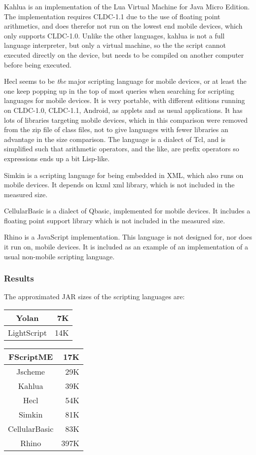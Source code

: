 \documentclass[11pt]{report}
\begin{document}
Kahlua \cite{kahlua} is an implementation of the Lua Virtual Machine for Java Micro Edition. 
The implementation requires CLDC-1.1 due to the use of floating point arithmetics, and does therefor not run on the lowest end mobile devices, which only supports CLDC-1.0.
Unlike the other languages, kahlua is not a full language interpreter, but only a virtual machine, so the the script cannot executed directly on the device, but needs to be compiled on another computer before being executed.

Hecl \cite{hecl} seems to be \emph{the} major scripting language for mobile devices, or at least the one keep popping up in the top of most queries when searching for scripting languages for mobile devices.
It is very portable, with different editions running on CLDC-1.0, CLDC-1.1, Android, as applets and as usual applications.
It has lots of libraries targeting mobile devices, which in this comparison were removed from the zip file of class files, not to give languages with fewer libraries an advantage in the size comparison.
The language is a dialect of Tcl, and is simplified such that arithmetic operators, and the like, are prefix operators so expressions ends up a bit Lisp-like.

Simkin \cite{simkin} is a scripting language for being embedded in XML, which also runs on mobile devices. It depends on kxml xml library, which is not included in the measured size. 

CellularBasic \cite{cellularbasic} is a dialect of Qbasic, implemented for mobile devices. 
It includes a floating point support library which is not included in the measured size. 

Rhino \cite{rhino} is a JavaScript implementation. This language is not designed for, nor does it run on, mobile devices. It is included as an example of an implementation of a usual non-mobile scripting language.

\subsubsection{Results}
The approximated JAR sizes of the scripting languages are:
\begin{center}
\begin{tabular}{|c|r|} \hline 
Yolan & 7K \\ \hline 
LightScript & 14K \\ \hline 
\end{tabular}
\begin{tabular}{|c|r|} \hline 
FScriptME & 17K \\ \hline 
Jscheme & 29K \\ \hline 
Kahlua & 39K \\ \hline 
Hecl & 54K \\ \hline 
Simkin & 81K \\ \hline 
CellularBasic & 83K \\ \hline 
Rhino & 397K \\ \hline 
\end{tabular}
\end{center}
\end{document}
